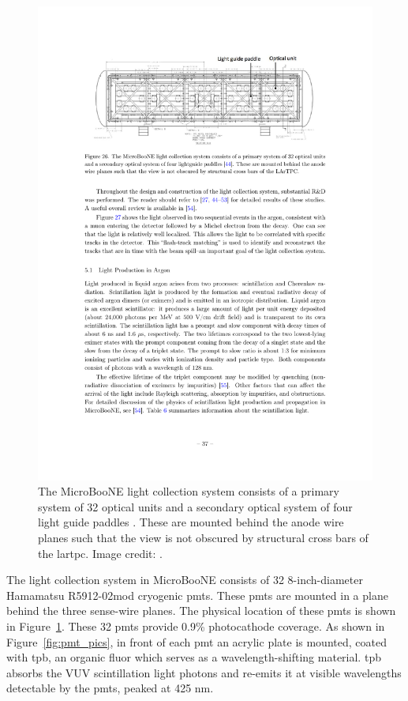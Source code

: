 \begin{figure}[]
\centering
\includegraphics[width=.80\textwidth]{images/MicroBooNE/pmt_map}
\caption[MicroBooNE Light Collection System]{The MicroBooNE light collection system consists of a primary system of 32 optical units and a secondary optical system of four light guide paddles \cite{ub_paddle}. These are mounted behind the anode wire planes such that the view is not obscured by structural cross bars of the \acrshort{lartpc}. Image credit: \cite{det}.}
\label{fig:pmt_map}
\end{figure}

The light collection system in MicroBooNE consists of 32 8-inch-diameter Hamamatsu R5912-02mod cryogenic \acrshort{pmt}s. These \acrshort{pmt}s are mounted in a plane behind the three sense-wire planes. The physical location of these \acrshort{pmt}s is shown in Figure~\ref{fig:pmt_map}. These 32 \acrshort{pmt}s provide 0.9\% photocathode coverage. As shown in Figure~\ref{fig:pmt_pics}, in front of each \acrshort{pmt} an acrylic plate is mounted, coated with \acrfull{tpb}, an organic fluor which serves as a wavelength-shifting material. \acrshort{tpb} absorbs the VUV scintillation light photons and re-emits it at visible wavelengths detectable by the \acrshort{pmt}s, peaked at 425 nm.


